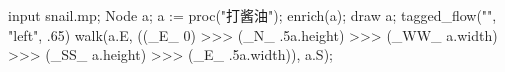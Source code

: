 \usemodule[zhfonts]
\startMPpage
input snail.mp;
Node a;
a := proc("打酱油");
enrich(a);
draw a;
tagged_flow("", "left", .65)
  walk(a.E, ((_E_ 0) >>> (_N_ .5a.height)
  >>> (_WW_ a.width) >>> (_SS_ a.height) >>> (_E_ .5a.width)), a.S);
\stopMPpage
